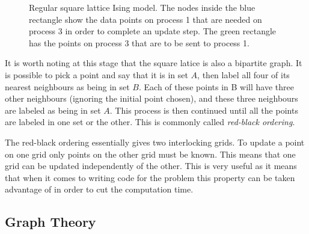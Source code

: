 \documentclass[pdftex,12pt,a4paper]{article}
\begin{document}
\begin{figure}
\begin{center}
\caption{Regular square lattice Ising model. The nodes inside the blue rectangle show the data points on process 1 that are needed on process 3 in order to complete an update step. The green rectangle has the points on process 3 that are to be sent to process 1.}
\end{center}
\end{figure}

It is worth noting at this stage that the square latice is also a bipartite graph. It is possible to pick a point and say that it is in set $A$, then label all four of its nearest neighbours as being in set $B$. Each of these points in B will have three other neighbours (ignoring the initial point chosen), and these three neighbours are labeled as being in set $A$. This process is then continued until all the points are labeled in one set or the other. This is commonly called \emph{red-black ordering}.

The red-black ordering essentially gives two interlocking grids. To update a point on one grid only points on the other grid must be known. This means that one grid can be updated independently of the other. This is very useful as it means that when it comes to writing code for the problem this property can be taken advantage of in order to cut the computation time.



\subsection{Graph Theory}
\end{document}
